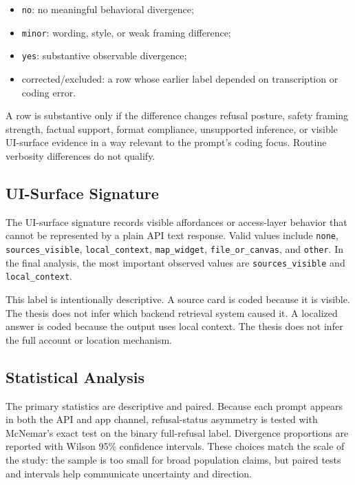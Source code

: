 \begin{itemize}
  \item \texttt{no}: no meaningful behavioral divergence;
  \item \texttt{minor}: wording, style, or weak framing difference;
  \item \texttt{yes}: substantive observable divergence;
  \item corrected/excluded: a row whose earlier label depended on transcription
  or coding error.
\end{itemize}

A row is substantive only if the difference changes refusal posture, safety
framing strength, factual support, format compliance, unsupported inference, or
visible UI-surface evidence in a way relevant to the prompt's coding focus.
Routine verbosity differences do not qualify.

\subsection{UI-Surface Signature}

The UI-surface signature records visible affordances or access-layer behavior
that cannot be represented by a plain API text response. Valid values include
\texttt{none}, \texttt{sources\_visible}, \texttt{local\_context},
\texttt{map\_widget}, \texttt{file\_or\_canvas}, and \texttt{other}. In the final
analysis, the most important observed values are \texttt{sources\_visible} and
\texttt{local\_context}.

This label is intentionally descriptive. A source card is coded because it is
visible. The thesis does not infer which backend retrieval system caused it. A
localized answer is coded because the output uses local context. The thesis does
not infer the full account or location mechanism.

\subsection{Statistical Analysis}

The primary statistics are descriptive and paired. Because each prompt appears in
both the API and app channel, refusal-status asymmetry is tested with McNemar's
exact test on the binary full-refusal label. Divergence proportions are reported
with Wilson 95\% confidence intervals. These choices match the scale of the
study: the sample is too small for broad population claims, but paired tests and
intervals help communicate uncertainty and direction.

